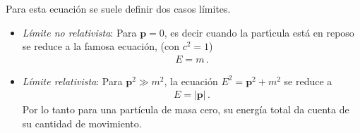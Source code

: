 \begin{frame}
Para esta ecuación se suele definir dos casos límites.
\begin{itemize}
\item \emph{Límite no relativista}: Para $\mathbf{p}=0$, es decir cuando la part\'\i cula est\'a en reposo se reduce a la famosa ecuaci\'on, (con $c^2=1$)
  \begin{align}
    E=m\,.
  \end{align}

\item \emph{Límite relativista}: Para $\mathbf{p}^2\gg m^2$, la ecuación $E^2=\mathbf{p}^2+m^2$ se reduce a
  \begin{align}
    E= |\mathbf{p}|\,.
  \end{align}
Por lo tanto para una partícula de masa cero, su energía total da cuenta de su cantidad de movimiento.
\end{itemize}

\end{frame}

